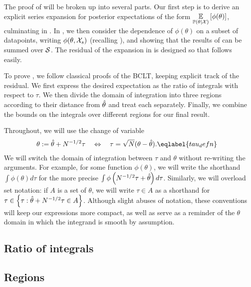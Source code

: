 

The proof of  will be broken up into several parts. Our
first step is to derive an explicit series expansion for posterior expectations
of the form $\underset{\mathbb{P}(\theta | {\mathcal{X}})}{\mathbb{E}}\left[\phi(\theta)\right]$, culminating in .
In , we then consider the dependence of $\phi(\theta)$ on a
subset of datapoints, writing $\phi(\theta, {\mathcal{X}}_s)$ (recalling
), and showing that the results of  can be
summed over $\mathcal{S}$. The residual of the expansion in  is
designed so that  follows easily.

To prove , we follow classical proofs of the BCLT, keeping
explicit track of the residual.  We first express the desired expectation as the
ratio of integrals with respect to $\tau$.  We then divide the domain of
integration into three regions according to their distance from $\hat\theta$ and
treat each separately. Finally, we combine the bounds on the integrals over
different regions for our final result.

Throughout, we will use the change of variable
%
\begin{align}
%
\theta := \thetahat + N^{-1/2} \tau
\quad\Leftrightarrow\quad
\tau = \sqrt{N} (\theta - \thetahat).
\eqlabel{tau_defn}
%
\end{align}
%
We will switch the domain of integration between $\tau$ and $\theta$ without
re-writing the arguments.  For example, for some function $\phi(\theta)$, we
will write the shorthand $\int \phi(\theta) d\tau$ for the more precise $\int
\phi\left(N^{-1/2} \tau + \hat\theta\right) d\tau$. Similarly, we will overload
set notation: if $A$ is a set of $\theta$, we will write $\tau \in A$ as a
shorthand for $\tau \in \left\{\tau: \hat\theta + N^{-1/2} \tau \in A \right\}$.
Although slight abuses of notation, these conventions will keep our expressions
more compact, as well as serve as a reminder of the $\theta$ domain in which the
integrand is smooth by assumption.


\subsection{Ratio of integrals}


\subsection{Regions}


